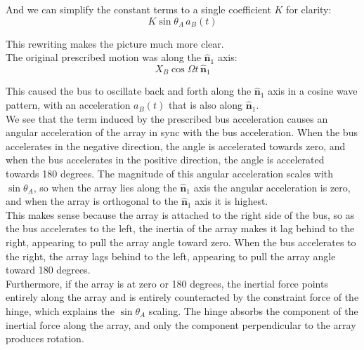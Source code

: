 \documentclass[titlepage]{article}
\begin{document}
And we can simplify the constant terms to a single coefficient $K$ for clarity:
\begin{equation}
	K\sin\theta_A\,a_B(t)
\end{equation}
\begin{mdframed}[linewidth=1pt, innertopmargin=10pt, innerbottommargin=10pt]
	This rewriting makes the picture much more clear.\\
	
	The original prescribed motion was along the $\hat{\boldsymbol{n}}_1$ axis:
	\begin{equation}
		X_B\cos\Omega t\,\hat{\boldsymbol{n}}_1
	\end{equation}
	
	This caused the bus to oscillate back and forth along the $\hat{\boldsymbol{n}}_1$ axis in a cosine wave pattern, with an acceleration $a_B(t)$ that is also along $\hat{\boldsymbol{n}}_1$.\\
	
	We see that the term induced by the prescribed bus acceleration causes an angular acceleration of the array in sync with the bus acceleration. When the bus accelerates in the negative direction, the angle is accelerated towards zero, and when the bus accelerates in the positive direction, the angle is accelerated towards 180 degrees. The magnitude of this angular acceleration scales with $\sin\theta_A$, so when the array lies along the $\hat{\boldsymbol{n}}_1$ axis the angular acceleration is zero, and when the array is orthogonal to the $\hat{\boldsymbol{n}}_1$ axis it is highest.\\
	
	This makes sense because the array is attached to the right side of the bus, so as the bus accelerates to the left, the inertia of the array makes it lag behind to the right, appearing to pull the array angle toward zero. When the bus accelerates to the right, the array lags behind to the left, appearing to pull the array angle toward 180 degrees.\\
	
	Furthermore, if the array is at zero or 180 degrees, the inertial force points entirely along the array and is entirely counteracted by the constraint force of the hinge, which explains the $\sin\theta_A$ scaling. The hinge absorbs the component of the inertial force along the array, and only the component perpendicular to the array produces rotation.
\end{mdframed}
\end{document}
